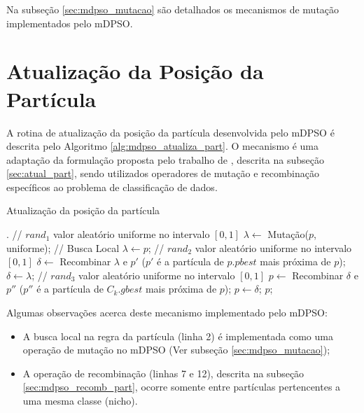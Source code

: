 \documentclass[
	12pt,				%
	openany,			%
	oneside,	
	a4paper,			%
	brazil,				%
	]{unimontes-ppgmsc-abntex2}
\begin{document}
Na subseção \ref{sec:mdpso_mutacao} são detalhados os mecanismos de mutação implementados pelo mDPSO.

\section{Atualização da Posição da Partícula}
\label{sec:mdpso_atual_pos_part}

A rotina de atualização da posição da partícula desenvolvida pelo mDPSO é descrita pelo Algoritmo \ref{alg:mdpso_atualiza_part}. O mecanismo é uma adaptação da formulação proposta pelo trabalho de , descrita na subseção \ref{sec:atual_part}, sendo utilizados operadores de mutação e recombinação específicos ao problema de classificação de dados. 

\begin{algorithm}[ht]
\caption{Atualização da posição da partícula}
\label{alg:mdpso_atualiza_part}
\begin{algorithmic}[1]
.
\State // $rand_1$ valor aleatório uniforme no intervalo $[0, 1]$
	\State $\lambda \leftarrow $ Mutação($p$, uniforme); // Busca Local 
\Else
	\State $\lambda \leftarrow p$;
\EndIf
\State // $rand_2$ valor aleatório uniforme no intervalo $[0, 1]$
	\State $\delta \leftarrow $ Recombinar $\lambda$ e $p'$ ($p'$ é a partícula de $p.pbest$ mais próxima de $p$);
\Else
	\State $\delta \leftarrow \lambda$;
\EndIf
\State // $rand_3$ valor aleatório uniforme no intervalo $[0, 1]$
	\State $p \leftarrow $ Recombinar $\delta$ e $p''$ ($p''$ é a partícula de $C_k.gbest$ mais próxima de $p$);
\Else
	\State $p \leftarrow \delta$;
\EndIf
\State \Return $p$;
\end{algorithmic}
\end{algorithm}

Algumas observações acerca deste mecanismo implementado pelo mDPSO:

\begin{itemize}
\item A busca local na regra da partícula (linha 2) é implementada como uma operação de mutação no mDPSO (Ver subseção \ref{sec:mdpso_mutacao});
\item A operação de recombinação (linhas 7 e 12), descrita na subseção \ref{sec:mdpso_recomb_part}, ocorre somente entre partículas pertencentes a uma mesma classe (nicho).
\end{itemize}
\end{document}
